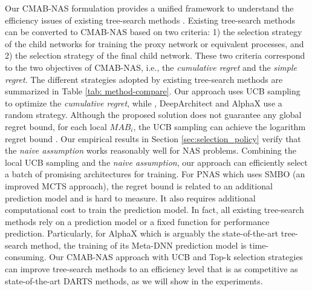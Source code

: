 \documentclass[conference]{IEEEtran}
\begin{document}
Our CMAB-NAS formulation provides a unified framework to understand the efficiency issues of existing tree-search methods \cite{liu2018progressive, negrinho2017deeparchitect, wang2019alphax, wistuba2017finding}.
Existing tree-search methods can be converted to CMAB-NAS based on two criteria: 1) the selection strategy of the child networks for training the proxy network or equivalent processes, and 2) the selection strategy of the final child network. These two criteria correspond to the two objectives of CMAB-NAS, i.e., the \emph{cumulative regret} and the \emph{simple regret}. 
The different strategies adopted by existing tree-search methods are summarized in Table \ref{tab: method-compare}.
Our approach uses UCB sampling to optimize the \emph{cumulative regret}, while \cite{wistuba2017finding}, DeepArchitect \cite{negrinho2017deeparchitect} and AlphaX \cite{wang2019alphax} use a random strategy.
Although the proposed solution does not guarantee any global regret bound, for each local $MAB_i$, the UCB sampling can achieve the logarithm regret bound \cite{auer2002finite}. Our empirical results in Section \ref{sec:selection_policy} verify that the \emph{naive assumption} works reasonably well for NAS problems.
Combining the local UCB sampling and the \emph{naive assumption}, our approach can efficiently select a batch of promising architectures for training. 
For PNAS \cite{liu2018progressive} which uses SMBO (an improved MCTS approach), the regret bound is related to an additional prediction model and is hard to measure. It also requires additional computational cost to train the prediction model.
In fact, all existing tree-search methods rely on a prediction model or a fixed function for performance prediction.
Particularly, for AlphaX \cite{wang2019alphax} which is arguably the state-of-the-art tree-search method, the training of its Meta-DNN prediction model is time-consuming.
Our CMAB-NAS approach with UCB and Top-k selection strategies can improve tree-search methods to an efficiency level that is as competitive as state-of-the-art DARTS methods, as we will show in the experiments.
\end{document}
